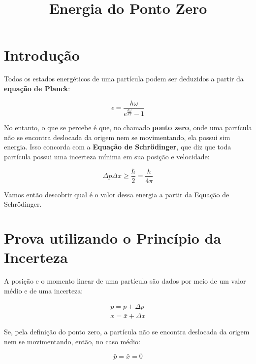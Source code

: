 
\title{Energia do Ponto Zero}


\maketitle

\section{Introdução}

Todos os estados energéticos de uma partícula podem ser deduzidos a partir da \textbf{equação de Planck}:

\begin{equation}
    \epsilon = \frac{h\omega}{e^{\frac{h\omega}{kT}} - 1}
    \label{eq1}
\end{equation}

No entanto, o que se percebe é que, no chamado \textbf{ponto zero}, onde uma partícula não se encontra deslocada da origem nem se movimentando, ela possui sim energia. Isso concorda com a \textbf{Equação de Schr\"odinger}, que diz que toda partícula possui uma incerteza mínima em sua posição e velocidade:

\begin{equation}
    \Delta p \Delta x \geq \frac{\hbar}{2} = \frac{h}{4\pi}
    \label{eq2}
\end{equation}

Vamos então descobrir qual é o valor dessa energia a partir da Equação de Schr\"odinger.

\section{Prova utilizando o Princípio da Incerteza}

A posição e o momento linear de uma partícula são dados por meio de um valor médio e de uma incerteza:

\begin{eqnarray}
    p = \bar{p} + \Delta p  \label{eq3} \\
    x = \bar{x} + \Delta x  \label{eq4}
\end{eqnarray}

Se, pela definição do ponto zero, a partícula não se encontra deslocada da origem nem se movimentando, então, no caso médio:

\begin{equation}
    \bar{p} = \bar{x} = 0   \label{eq5}
\end{equation}

